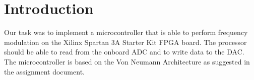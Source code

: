 \section{Introduction}

Our task was to implement a microcontroller that is able to perform frequency modulation on the Xilinx Spartan 3A Starter Kit FPGA board. The processor should be able to read from the onboard ADC and to write data to the DAC. The microcontroller is based on the Von Neumann Architecture as suggested in the assignment document.
	


